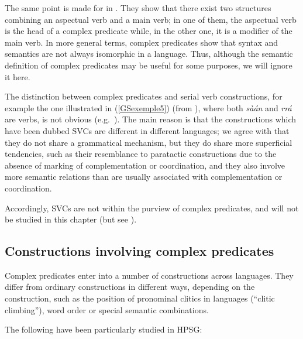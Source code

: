 The same point is made for  in . They show that there exist two structures combining an aspectual verb and a main verb; in one of them, the aspectual verb is the head of a complex predicate while, in the other one, it is a modifier of the main verb. In more general terms, complex predicates show that syntax and semantics are not always isomorphic in a language. Thus, although the semantic definition of complex predicates may be useful for some purposes, we will ignore it here.

The distinction between complex predicates and serial verb constructions, for example the one illustrated in (\ref{GSexemple5}) (from \citealt[294]{MH2016}), where both \emph{sàán} and \emph{rrá} are verbs, is not obvious (e.g.\ \citealt{andrews1999complex, MH2016}). The main reason is that the constructions which have been dubbed SVCs are different in different languages; we agree with \citet{andrews1999complex} that they do not share a grammatical mechanism, but they do share more superficial tendencies, such as their resemblance to paratactic constructions due to the absence of marking of complementation or coordination, and they also involve more semantic relations than are usually associated with complementation or coordination.

\z

Accordingly, SVCs are not within the purview of complex predicates, and will not be studied in this chapter (but see \citealt{lee14}).

\subsection{Constructions involving complex predicates}\label{GSsection1.2}

Complex predicates enter into a number of constructions across languages. They differ from ordinary constructions in different ways, depending on the construction, such as the position of pronominal clitics in  languages (``clitic climbing''), word order or special semantic combinations. 

The following have been particularly studied in HPSG:

